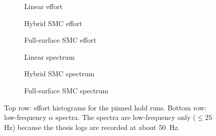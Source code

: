 \begin{figure}[htbp]
  \centering
  \begin{subfigure}[t]{0.32\linewidth}
    \centering
    \caption{Linear effort}
  \end{subfigure}\hfill
  \begin{subfigure}[t]{0.32\linewidth}
    \centering
    \caption{Hybrid SMC effort}
  \end{subfigure}\hfill
  \begin{subfigure}[t]{0.32\linewidth}
    \centering
    \caption{Full-surface SMC effort}
  \end{subfigure}

  \medskip

  \begin{subfigure}[t]{0.32\linewidth}
    \centering
    \caption{Linear spectrum}
  \end{subfigure}\hfill
  \begin{subfigure}[t]{0.32\linewidth}
    \centering
    \caption{Hybrid SMC spectrum}
  \end{subfigure}\hfill
  \begin{subfigure}[t]{0.32\linewidth}
    \centering
    \caption{Full-surface SMC spectrum}
  \end{subfigure}
  \caption{Top row: effort histograms for the pinned hold runs. Bottom row: low-frequency $\alpha$ spectra. The spectra are low-frequency only ($\leq 25$ Hz) because the thesis logs are recorded at about \SI{50}{Hz}.}
  \label{fig:hold_effort_spectrum_support}
\end{figure}

